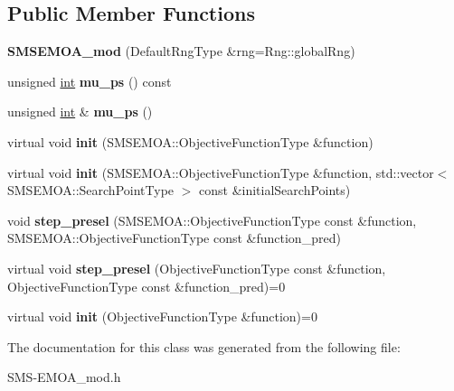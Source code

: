 \subsection*{Public Member Functions}
\begin{DoxyCompactItemize}
\item 
{\bfseries S\+M\+S\+E\+M\+O\+A\+\_\+mod} (Default\+Rng\+Type \&rng=Rng\+::global\+Rng)\hypertarget{classSMSEMOA__mod_a4d4cb767befc1e07b905fcdb36edc9e3}{}\label{classSMSEMOA__mod_a4d4cb767befc1e07b905fcdb36edc9e3}

\item 
unsigned \hyperlink{classint}{int} {\bfseries mu\+\_\+ps} () const \hypertarget{classSMSEMOA__mod_ade9f68d3312ba25e8df40c1e9fad8974}{}\label{classSMSEMOA__mod_ade9f68d3312ba25e8df40c1e9fad8974}

\item 
unsigned \hyperlink{classint}{int} \& {\bfseries mu\+\_\+ps} ()\hypertarget{classSMSEMOA__mod_ab55e4b964e10ba6f9ab1158aebb91ef1}{}\label{classSMSEMOA__mod_ab55e4b964e10ba6f9ab1158aebb91ef1}

\item 
virtual void {\bfseries init} (S\+M\+S\+E\+M\+O\+A\+::\+Objective\+Function\+Type \&function)\hypertarget{classSMSEMOA__mod_a87a07a42405d98d3e78cdc08f679019e}{}\label{classSMSEMOA__mod_a87a07a42405d98d3e78cdc08f679019e}

\item 
virtual void {\bfseries init} (S\+M\+S\+E\+M\+O\+A\+::\+Objective\+Function\+Type \&function, std\+::vector$<$ S\+M\+S\+E\+M\+O\+A\+::\+Search\+Point\+Type $>$ const \&initial\+Search\+Points)\hypertarget{classSMSEMOA__mod_ab6aacb03dbf1f323ea002519bd3d4782}{}\label{classSMSEMOA__mod_ab6aacb03dbf1f323ea002519bd3d4782}

\item 
void {\bfseries step\+\_\+presel} (S\+M\+S\+E\+M\+O\+A\+::\+Objective\+Function\+Type const \&function, S\+M\+S\+E\+M\+O\+A\+::\+Objective\+Function\+Type const \&function\+\_\+pred)\hypertarget{classSMSEMOA__mod_a3b879ff8c0afed9144bca929d3bbc809}{}\label{classSMSEMOA__mod_a3b879ff8c0afed9144bca929d3bbc809}

\item 
virtual void {\bfseries step\+\_\+presel} (Objective\+Function\+Type const \&function, Objective\+Function\+Type const \&function\+\_\+pred)=0\hypertarget{classAbstractPreselecter_ac7bd0dac8d7eaf85319524ee6d80f52d}{}\label{classAbstractPreselecter_ac7bd0dac8d7eaf85319524ee6d80f52d}

\item 
virtual void {\bfseries init} (Objective\+Function\+Type \&function)=0\hypertarget{classAbstractPreselecter_ac9283e597dc5d633b1f7ce959881dbb8}{}\label{classAbstractPreselecter_ac9283e597dc5d633b1f7ce959881dbb8}

\end{DoxyCompactItemize}


The documentation for this class was generated from the following file\+:\begin{DoxyCompactItemize}
\item 
S\+M\+S-\/\+E\+M\+O\+A\+\_\+mod.\+h\end{DoxyCompactItemize}
